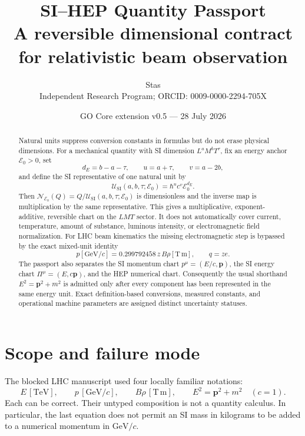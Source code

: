 \documentclass[11pt,a4paper]{article}
\title{\bfseries SI--HEP Quantity Passport\\
\large A reversible dimensional contract for relativistic beam observation}
\author{Stas\\
\small Independent Research Program; ORCID: 0009-0000-2294-705X}
\date{GO Core extension v0.5 --- 28 July 2026}
\theoremstyle{definition}
\theoremstyle{plain}
\theoremstyle{remark}
\newcommand{\Ezero}{\mathcal E_0}
\newcommand{\USI}{\mathcal U_{\mathrm{SI}}}
\newcommand{\Nhep}{\mathcal N_{\Ezero}}
\newcommand{\GeV}{\mathrm{GeV}}
\begin{document}
\maketitle

\begin{center}
\end{center}

\begin{abstract}
Natural units suppress conversion constants in formulas but do not
erase physical dimensions. For a mechanical quantity with SI dimension
\(L^aM^bT^\tau\), fix an energy anchor \(\Ezero>0\), set
\[
 d_E=b-a-\tau,\qquad u=a+\tau,\qquad v=a-2b,
\]
and define the SI representative of one natural unit by
\[
 \USI(a,b,\tau;\Ezero)=\hbar^u c^v\Ezero^{d_E}.
\]
Then
\(\Nhep(Q)=Q/\USI(a,b,\tau;\Ezero)\) is dimensionless and the inverse
map is multiplication by the same representative. This gives a
multiplicative, exponent-additive, reversible chart on the \(LMT\)
sector. It does not automatically cover current, temperature, amount
of substance, luminous intensity, or electromagnetic field
normalization. For LHC beam kinematics the missing electromagnetic
step is bypassed by the exact mixed-unit identity
\[
 p[\GeV/c]=0.299792458\,z\,B\rho[\mathrm{T\,m}],
\qquad q=ze.
\]
The passport also separates the SI momentum chart
\(p^\mu=(E/c,\bm p)\), the SI energy chart
\(\Pi^\mu=(E,c\bm p)\), and the HEP numerical chart. Consequently the
usual shorthand \(E^2=\bm p^2+m^2\) is admitted only after every
component has been represented in the same energy unit. Exact
definition-based conversions, measured constants, and operational
machine parameters are assigned distinct uncertainty statuses.
\end{abstract}

\tableofcontents

\section{Scope and failure mode}

The blocked LHC manuscript used four locally familiar notations:
\[
 E\,[\mathrm{TeV}],\qquad
 p\,[\GeV/c],\qquad
 B\rho\,[\mathrm{T\,m}],\qquad
 E^2=\bm p^2+m^2\quad(c=1).
\]
Each can be correct. Their untyped composition is not a quantity
calculus. In particular, the last equation does not permit an SI mass
in kilograms to be added to a numerical momentum in \(\GeV/c\).
\end{document}
